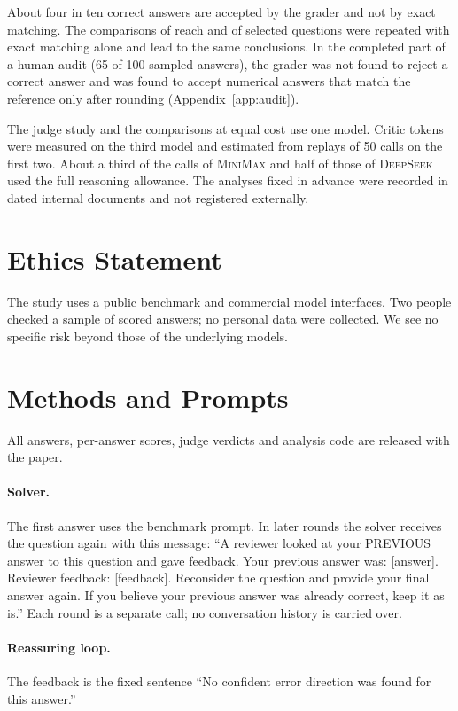 \documentclass[11pt]{article}
\newcommand{\ds}{\textsc{DeepSeek}}
\newcommand{\mm}{\textsc{MiniMax}}
\begin{document}
About four in ten correct answers are accepted by the grader and not by exact matching.
The comparisons of reach and of selected questions were repeated with exact matching alone and lead to the same conclusions.
In the completed part of a human audit (65 of 100 sampled answers), the grader was not found to reject a correct answer and was found to accept numerical answers that match the reference only after rounding (Appendix~\ref{app:audit}).

The judge study and the comparisons at equal cost use one model.
Critic tokens were measured on the third model and estimated from replays of 50 calls on the first two.
About a third of the calls of \mm{} and half of those of \ds{} used the full reasoning allowance.
The analyses fixed in advance were recorded in dated internal documents and not registered externally.

\section*{Ethics Statement}

The study uses a public benchmark and commercial model interfaces.
Two people checked a sample of scored answers; no personal data were collected.
We see no specific risk beyond those of the underlying models.



\appendix

\section{Methods and Prompts}
\label{app:prompts}

All answers, per-answer scores, judge verdicts and analysis code are released with the paper.

\paragraph{Solver.}
The first answer uses the benchmark prompt.
In later rounds the solver receives the question again with this message: ``A reviewer looked at your PREVIOUS answer to this question and gave feedback. Your previous answer was: [answer]. Reviewer feedback: [feedback]. Reconsider the question and provide your final answer again. If you believe your previous answer was already correct, keep it as is.''
Each round is a separate call; no conversation history is carried over.

\paragraph{Reassuring loop.}
The feedback is the fixed sentence ``No confident error direction was found for this answer.''
\end{document}
